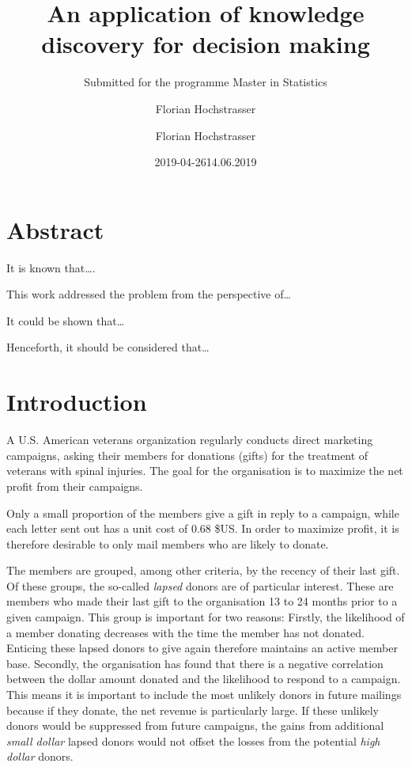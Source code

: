 \documentclass[
  11pt,
  a4paper,
  DIV=12,captions=tableheading,oneside]{scrbook}
\author{Florian Hochstrasser}
\date{2019-04-26}
\begin{document}
\begin{titlepage}

\titlehead{Master Thesis}
\subject{Profit maximisation for direct marketing campaigns}
\title{An application of knowledge discovery for decision making}
\subtitle{Submitted for the programme Master in Statistics}
\author{Florian Hochstrasser}
\date{14.06.2019}
\publishers{Supervisor: Jacques Zuber}
\extratitle{ }
\uppertitleback{Obiger Titelrückentitel}
\lowertitleback{Für dieses Beispiel wird keine Haftung übernommen.}
\dedication{Dieses Beispiel widme ich\\allen LaTeX Usern}

\end{titlepage}

{
\setcounter{tocdepth}{2}
\tableofcontents
}
\hypertarget{abstract}{%
\chapter*{Abstract}\label{abstract}}

It is known that\ldots{}.

This work addressed the problem from the perspective of\ldots{}

It could be shown that\ldots{}

Henceforth, it should be considered that\ldots{}

\hypertarget{intro}{%
\chapter{Introduction}\label{intro}}

A U.S. American veterans organization regularly conducts direct marketing campaigns, asking their members for donations (gifts) for the treatment of veterans with spinal injuries. The goal for the organisation is to maximize the net profit from their campaigns.

Only a small proportion of the members give a gift in reply to a campaign, while each letter sent out has a unit cost of 0.68 \$US. In order to maximize profit, it is therefore desirable to only mail members who are likely to donate.

The members are grouped, among other criteria, by the recency of their last gift. Of these groups, the so-called \emph{lapsed} donors are of particular interest. These are members who made their last gift to the organisation 13 to 24 months prior to a given campaign.
This group is important for two reasons: Firstly, the likelihood of a member donating decreases with the time the member has not donated. Enticing these lapsed donors to give again therefore maintains an active member base. Secondly, the organisation has found that there is a negative correlation between the dollar amount donated and the likelihood to respond to a campaign. This means it is important to include the most unlikely donors in future mailings because if they donate, the net revenue is particularly large. If these unlikely donors would be suppressed from future campaigns, the gains from additional \emph{small dollar} lapsed donors would not offset the losses from the potential \emph{high dollar} donors.
\end{document}
